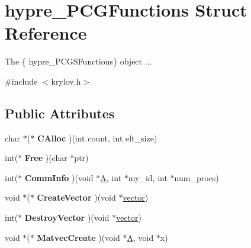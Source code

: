 \hypertarget{structhypre__PCGFunctions}{}\section{hypre\+\_\+\+P\+C\+G\+Functions Struct Reference}
\label{structhypre__PCGFunctions}


The \{ hypre\+\_\+\+P\+C\+G\+S\+Functions\} object ...  




{\ttfamily \#include $<$krylov.\+h$>$}

\subsection*{Public Attributes}
\begin{DoxyCompactItemize}
\item 
\hypertarget{structhypre__PCGFunctions_a9227081d5e1d60fd52a2578665beadcd}{}char $\ast$($\ast$ {\bfseries C\+Alloc} )(int count, int elt\+\_\+size)\label{structhypre__PCGFunctions_a9227081d5e1d60fd52a2578665beadcd}

\item 
\hypertarget{structhypre__PCGFunctions_a9429469673443de0876467fe65186a6f}{}int($\ast$ {\bfseries Free} )(char $\ast$ptr)\label{structhypre__PCGFunctions_a9429469673443de0876467fe65186a6f}

\item 
\hypertarget{structhypre__PCGFunctions_aa458c85ad17c7d050f55422e0ec1279f}{}int($\ast$ {\bfseries Comm\+Info} )(void $\ast$\hyperlink{structA}{A}, int $\ast$my\+\_\+id, int $\ast$num\+\_\+procs)\label{structhypre__PCGFunctions_aa458c85ad17c7d050f55422e0ec1279f}

\item 
\hypertarget{structhypre__PCGFunctions_a35e2613ac632ef8b77934cee783e9a20}{}void $\ast$($\ast$ {\bfseries Create\+Vector} )(void $\ast$\hyperlink{structvector}{vector})\label{structhypre__PCGFunctions_a35e2613ac632ef8b77934cee783e9a20}

\item 
\hypertarget{structhypre__PCGFunctions_a48a82a3e380535d99d8322f2e9412ecc}{}int($\ast$ {\bfseries Destroy\+Vector} )(void $\ast$\hyperlink{structvector}{vector})\label{structhypre__PCGFunctions_a48a82a3e380535d99d8322f2e9412ecc}

\item 
\hypertarget{structhypre__PCGFunctions_a24ddb6b13eac2dde67bd898311f57869}{}void $\ast$($\ast$ {\bfseries Matvec\+Create} )(void $\ast$\hyperlink{structA}{A}, void $\ast$x)\label{structhypre__PCGFunctions_a24ddb6b13eac2dde67bd898311f57869}


\end{DoxyCompactItemize}
